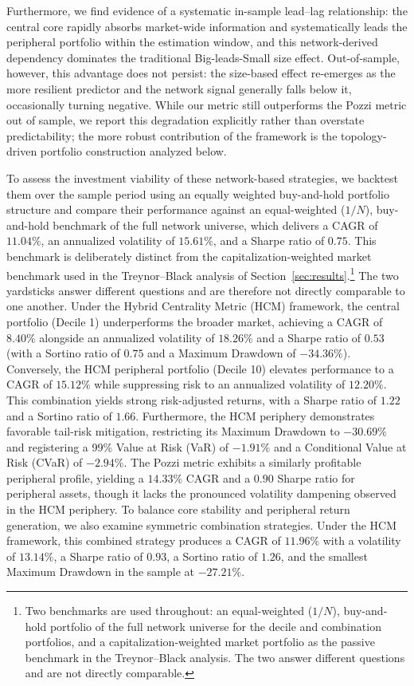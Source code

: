 \documentclass[fleqn]{rbfin}
\begin{document}
Furthermore, we find evidence of a systematic in-sample lead--lag relationship: the central core rapidly absorbs market-wide information and systematically leads the peripheral portfolio within the estimation window, and this network-derived dependency dominates the traditional Big-leads-Small size effect. Out-of-sample, however, this advantage does not persist: the size-based effect re-emerges as the more resilient predictor and the network signal generally falls below it, occasionally turning negative. While our metric still outperforms the Pozzi metric out of sample, we report this degradation explicitly rather than overstate predictability; the more robust contribution of the framework is the topology-driven portfolio construction analyzed below.

To assess the investment viability of these network-based strategies, we backtest them over the sample period using an equally weighted buy-and-hold portfolio structure and compare their performance against an equal-weighted ($1/N$), buy-and-hold benchmark of the full network universe, which delivers a CAGR of $11.04\%$, an annualized volatility of $15.61\%$, and a Sharpe ratio of $0.75$. This benchmark is deliberately distinct from the capitalization-weighted market benchmark used in the Treynor--Black analysis of Section~\ref{sec:results}.\footnote{Two benchmarks are used throughout: an equal-weighted ($1/N$), buy-and-hold portfolio of the full network universe for the decile and combination portfolios, and a capitalization-weighted market portfolio as the passive benchmark in the Treynor--Black analysis. The two answer different questions and are not directly comparable.} The two yardsticks answer different questions and are therefore not directly comparable to one another. Under the Hybrid Centrality Metric (HCM) framework, the central portfolio (Decile 1) underperforms the broader market, achieving a CAGR of $8.40\%$ alongside an annualized volatility of $18.26\%$ and a Sharpe ratio of $0.53$ (with a Sortino ratio of $0.75$ and a Maximum Drawdown of $-34.36\%$). Conversely, the HCM peripheral portfolio (Decile 10) elevates performance to a CAGR of $15.12\%$ while suppressing risk to an annualized volatility of $12.20\%$. This combination yields strong risk-adjusted returns, with a Sharpe ratio of $1.22$ and a Sortino ratio of $1.66$. Furthermore, the HCM periphery demonstrates favorable tail-risk mitigation, restricting its Maximum Drawdown to $-30.69\%$ and registering a 99\% Value at Risk (VaR) of $-1.91\%$ and a Conditional Value at Risk (CVaR) of $-2.94\%$. The Pozzi metric exhibits a similarly profitable peripheral profile, yielding a $14.33\%$ CAGR and a $0.90$ Sharpe ratio for peripheral assets, though it lacks the pronounced volatility dampening observed in the HCM periphery. To balance core stability and peripheral return generation, we also examine symmetric combination strategies. Under the HCM framework, this combined strategy produces a CAGR of $11.96\%$ with a volatility of $13.14\%$, a Sharpe ratio of $0.93$, a Sortino ratio of $1.26$, and the smallest Maximum Drawdown in the sample at $-27.21\%$.
\end{document}
